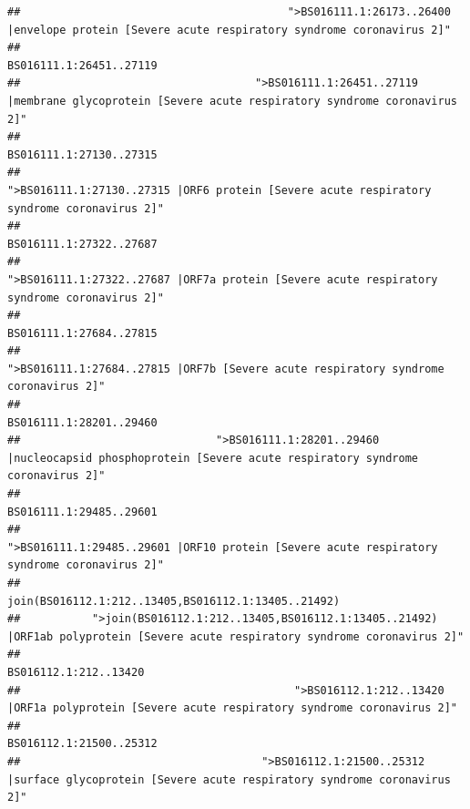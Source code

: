 \documentclass[
]{article}
\begin{document}
\begin{verbatim}
##                                         ">BS016111.1:26173..26400 |envelope protein [Severe acute respiratory syndrome coronavirus 2]" 
##                                                                                                                BS016111.1:26451..27119 
##                                    ">BS016111.1:26451..27119 |membrane glycoprotein [Severe acute respiratory syndrome coronavirus 2]" 
##                                                                                                                BS016111.1:27130..27315 
##                                             ">BS016111.1:27130..27315 |ORF6 protein [Severe acute respiratory syndrome coronavirus 2]" 
##                                                                                                                BS016111.1:27322..27687 
##                                            ">BS016111.1:27322..27687 |ORF7a protein [Severe acute respiratory syndrome coronavirus 2]" 
##                                                                                                                BS016111.1:27684..27815 
##                                                    ">BS016111.1:27684..27815 |ORF7b [Severe acute respiratory syndrome coronavirus 2]" 
##                                                                                                                BS016111.1:28201..29460 
##                              ">BS016111.1:28201..29460 |nucleocapsid phosphoprotein [Severe acute respiratory syndrome coronavirus 2]" 
##                                                                                                                BS016111.1:29485..29601 
##                                            ">BS016111.1:29485..29601 |ORF10 protein [Severe acute respiratory syndrome coronavirus 2]" 
##                                                                                    join(BS016112.1:212..13405,BS016112.1:13405..21492) 
##           ">join(BS016112.1:212..13405,BS016112.1:13405..21492) |ORF1ab polyprotein [Severe acute respiratory syndrome coronavirus 2]" 
##                                                                                                                  BS016112.1:212..13420 
##                                          ">BS016112.1:212..13420 |ORF1a polyprotein [Severe acute respiratory syndrome coronavirus 2]" 
##                                                                                                                BS016112.1:21500..25312 
##                                     ">BS016112.1:21500..25312 |surface glycoprotein [Severe acute respiratory syndrome coronavirus 2]" 

\end{verbatim}
\end{document}
